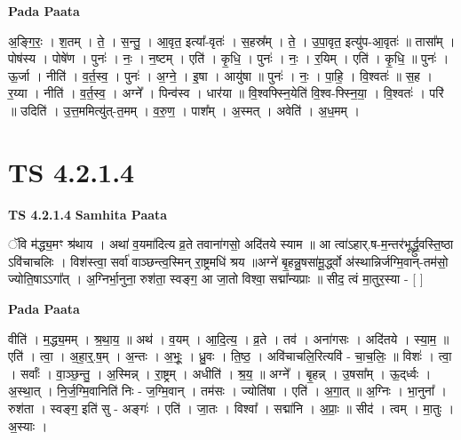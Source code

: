 \documentclass[17pt]{extarticle}
\begin{document}
\textbf{Pada Paata} \newline

अ॒ङ्गि॒रः॒ । श॒तम् । ते॒ । स॒न्तु॒ । आ॒वृत॒ इत्या᳚-वृतः॑ । स॒हस्र᳚म् । ते॒ । उ॒पा॒वृत॒ इत्यु॑प-आ॒वृतः॑ ॥ तासा᳚म् । पोष॑स्य । पोषे॑ण । पुनः॑ । नः॒ । न॒ष्टम् । एति॑ । कृ॒धि॒ । पुनः॑ । नः॒ । र॒यिम् । एति॑ । कृ॒धि॒ ॥ पुनः॑ । ऊ॒र्जा । नीति॑ । व॒र्त॒स्व॒ । पुनः॑ । अ॒ग्ने॒ । इ॒षा । आयु॑षा ॥ पुनः॑ । नः॒ । पा॒हि॒ । वि॒श्वतः॑ ॥ स॒ह । र॒य्या । नीति॑ । व॒र्त॒स्व॒ । अग्ने᳚ । पिन्व॑स्व । धार॑या ॥ वि॒श्वफ्स्नि॒येति॑ वि॒श्व-फ्स्नि॒या॒ । वि॒श्वतः॑ । परि॑ ॥ उदिति॑ । उ॒त्त॒ममित्यु॑त्-त॒मम् । व॒रु॒ण॒ । पाश᳚म् । अ॒स्मत् । अवेति॑ । अ॒ध॒मम् ।  \newline




\section*{ TS 4.2.1.4 }

\textbf{TS 4.2.1.4 } \newline
\textbf{Samhita Paata} \newline

ॅवि म॑द्ध्य॒मꣳ श्र॑थाय । अथा॑ व॒यमा॑दित्य व्र॒ते तवाना॑गसो॒ अदि॑तये स्याम ॥ आ त्वा॑ऽहार्.ष-म॒न्तर॑भूर्द्ध्रु॒वस्ति॒ष्ठा ऽवि॑चाचलिः । विश॑स्त्वा॒ सर्वा॑ वाञ्छन्त्व॒स्मिन् रा॒ष्ट्रमधि॑ श्रय ॥अग्ने॑ बृ॒हन्नु॒षसा॑मू॒र्द्ध्वो अ॑स्थान्निर्जग्मि॒वान्-तम॑सो॒ ज्योति॒षाऽऽगा᳚त् । अ॒ग्निर्भा॒नुना॒ रुश॑ता॒ स्वङ्ग॒ आ जा॒तो विश्वा॒ सद्मा᳚न्यप्राः ॥ सीद॒ त्वं मा॒तुर॒स्या - [  ] \newline

\textbf{Pada Paata} \newline

वीति॑ । म॒द्ध्य॒मम् । श्र॒था॒य॒ ॥ अथ॑ । व॒यम् । आ॒दि॒त्य॒ । व्र॒ते । तव॑ । अना॑गसः । अदि॑तये । स्या॒म॒ ॥ एति॑ । त्वा॒ । अ॒हा॒र्॒.ष॒म् । अ॒न्तः । अ॒भूः॒ । ध्रु॒वः । ति॒ष्ठ॒ । अवि॑चाचलि॒रित्यवि॑ - चा॒च॒लिः॒ ॥ विशः॑ । त्वा॒ । सर्वाः᳚ । वा॒ञ्छ॒न्तु॒ । अ॒स्मिन्न् । रा॒ष्ट्रम् । अधीति॑ । श्र॒य॒ ॥ अग्ने᳚ । बृ॒हन्न् । उ॒षसा᳚म् । ऊ॒द्‌र्ध्वः । अ॒स्था॒त् । नि॒र्ज॒ग्मि॒वानिति॑ निः - ज॒ग्मि॒वान् । तम॑सः । ज्योति॑षा । एति॑ । अ॒गा॒त् ॥ अ॒ग्निः । भा॒नुना᳚ । रुश॑ता । स्वङ्ग॒ इति॑ सु - अङ्गः॑ । एति॑ । जा॒तः । विश्वा᳚ । सद्मा॑नि । अ॒प्राः॒ ॥ सीद॑ । त्वम् । मा॒तुः । अ॒स्याः ।  \newline




\end{document}
